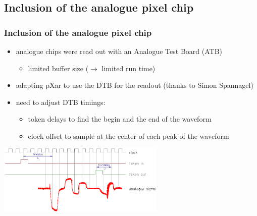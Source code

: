 \documentclass[9pt]{beamer}
\begin{document}
\subsection{Inclusion of the analogue pixel chip}
\begin{frame}
	\frametitle{Inclusion of the analogue pixel chip}
	\begin{itemize}
		\setlength{\itemsep}{\fill}
		\item analogue chips were read out with an Analogue Test Board (ATB)
		\begin{itemize}
			\item limited buffer size ($\rightarrow$ limited run time)
		\end{itemize}
		\item adapting pXar to use the DTB for the readout (thanks to Simon Spannagel)
		\item need to adjust DTB timings:
		\begin{itemize}
			\item token delays to find the begin and the end of the waveform
			\item clock offset to sample at the center of each peak of the waveform
		\end{itemize}
	\end{itemize}
	\begin{center}
		\includegraphics[width=8cm]{tbdelays}
	\end{center}
\end{frame}
\end{document}
